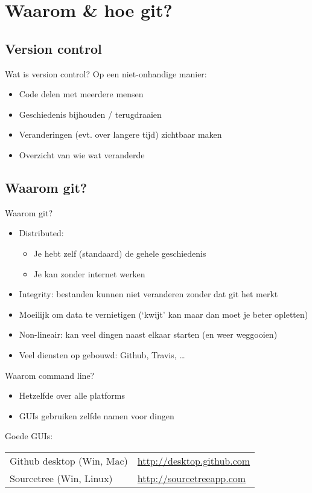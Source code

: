 \section{Waarom \& hoe git?}

\subsection{Version control}
\begin{frame}{Wat is version control?}
	Op een niet-onhandige manier:
		\begin{itemize}
			\item Code delen met meerdere mensen
			\item Geschiedenis bijhouden / terugdraaien
			\item Veranderingen (evt. over langere tijd) zichtbaar maken
			\item Overzicht van wie wat veranderde
		\end{itemize}
\end{frame}

\subsection{Waarom git?}
\begin{frame}{Waarom git?}
	\begin{itemize}
		\item Distributed:
			\begin{itemize}
				\item Je hebt zelf (standaard) de gehele geschiedenis
				\item Je kan zonder internet werken
			\end{itemize}
		\item Integrity: bestanden kunnen niet veranderen zonder dat git het merkt
		\item Moeilijk om data te vernietigen (`kwijt' kan maar dan moet je beter opletten)
		\item Non-lineair: kan veel dingen naast elkaar starten (en weer weggooien)
		\item Veel diensten op gebouwd: Github, Travis, \ldots
	\end{itemize}
\end{frame}

\begin{frame}{Waarom command line?}
	\begin{itemize}
		\item Hetzelfde over alle platforms
		\item GUIs gebruiken zelfde namen voor dingen
	\end{itemize}
	Goede GUIs:
	\vspace{15mm}
	\begin{tabular}{ll}
		Github desktop (Win, Mac)&\url{http://desktop.github.com}\\
		Sourcetree (Win, Linux)&\url{http://sourcetreeapp.com}
	\end{tabular}
\end{frame}
